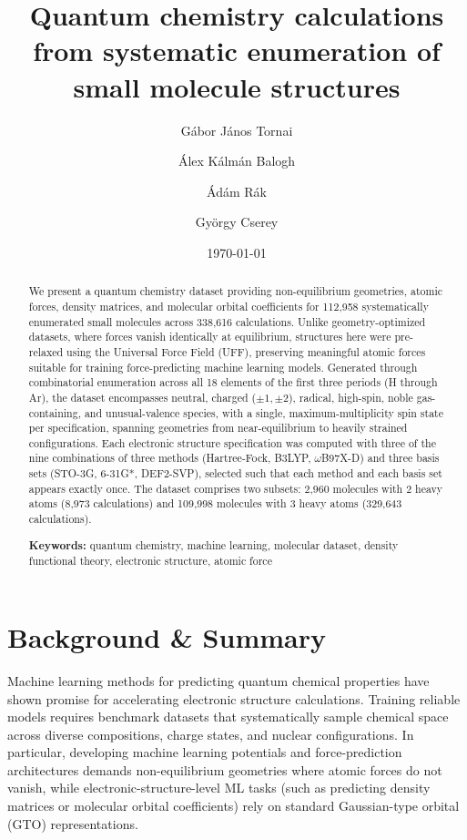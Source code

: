 \documentclass[fleqn,10pt]{article}
\title{Quantum chemistry calculations from systematic enumeration of small molecule structures}
\author[1]{Gábor János Tornai}
\author[1]{Álex Kálmán Balogh}
\author[1]{Ádám Rák}
\author[2]{György Cserey}
\affil[1]{StreamNovation Ltd.}
\affil[2]{Pázmány Péter Catholic University, Faculty of Information Technology and Bionics}
\date{\today}
\begin{document}
\maketitle

\begin{abstract}
We present a quantum chemistry dataset providing non-equilibrium geometries, atomic forces, density matrices, and molecular orbital coefficients for 112,958 systematically enumerated small molecules across 338,616 calculations. Unlike geometry-optimized datasets, where forces vanish identically at equilibrium, structures here were pre-relaxed using the Universal Force Field (UFF), preserving meaningful atomic forces suitable for training force-predicting machine learning models. Generated through combinatorial enumeration across all 18 elements of the first three periods (H through Ar), the dataset encompasses neutral, charged ($\pm 1, \pm 2$), radical, high-spin, noble gas-containing, and unusual-valence species, with a single, maximum-multiplicity spin state per specification, spanning geometries from near-equilibrium to heavily strained configurations. Each electronic structure specification was computed with three of the nine combinations of three methods (Hartree-Fock, B3LYP, $\omega$B97X-D) and three basis sets (STO-3G, 6-31G*, DEF2-SVP), selected such that each method and each basis set appears exactly once. The dataset comprises two subsets: 2,960 molecules with 2 heavy atoms (8,973 calculations) and 109,998 molecules with 3 heavy atoms (329,643 calculations).

\textbf{Keywords:} quantum chemistry, machine learning, molecular dataset, density functional theory, electronic structure, atomic force
\end{abstract}
\section*{Background \& Summary}

Machine learning methods for predicting quantum chemical properties have shown promise for accelerating electronic structure calculations\cite{schuett2019, neurips2021, bigdata_bde}. Training reliable models requires benchmark datasets that systematically sample chemical space across diverse compositions, charge states, and nuclear configurations. In particular, developing machine learning potentials and force-prediction architectures demands non-equilibrium geometries where atomic forces do not vanish, while electronic-structure-level ML tasks (such as predicting density matrices or molecular orbital coefficients) rely on standard Gaussian-type orbital (GTO) representations.
\end{document}
